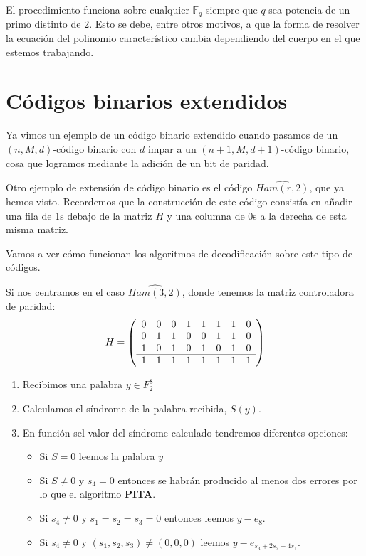 \obs El procedimiento funciona sobre cualquier $\mathbb{F}_q$ siempre que $q$ sea potencia de un primo distinto de 2. Esto se debe, entre otros motivos, a que la forma de resolver la ecuación del polinomio característico cambia dependiendo del cuerpo en el que estemos trabajando.

\section{Códigos binarios extendidos}
Ya vimos un ejemplo de un código binario extendido cuando pasamos de un $(n,M,d)$-código binario con $d$ impar a un $(n+1,M,d+1)$-código binario, cosa que logramos mediante la adición de un bit de paridad.

Otro ejemplo de extensión de código binario es el código $\widehat{Ham(r,2)}$, que ya hemos visto. Recordemos que la construcción de este código consistía en añadir una fila de 1s debajo de la matriz $H$ y una columna de 0s a la derecha de esta misma matriz.

Vamos a ver cómo funcionan los algoritmos de decodificación sobre este tipo de códigos.

Si nos centramos en el caso $\widehat{Ham(3,2)}$, donde tenemos la matriz controladora de paridad:
\[H=\left( \begin{array}{ccccccc | c}
0 & 0 & 0 & 1 & 1 & 1 & 1 & 0 \\
0 & 1 & 1 & 0 & 0 & 1 & 1 & 0 \\
1 & 0 & 1 & 0 & 1 & 0 & 1 & 0 \\ \hline
1 & 1 & 1 & 1 & 1 & 1 & 1 & 1
\end{array}\right)\]

\begin{enumerate}
\item Recibimos una palabra $y\in F_2^8$
\item Calculamos el síndrome de la palabra recibida, $S(y)$.
\item En función sel valor del síndrome calculado tendremos diferentes opciones:
\begin{itemize}
\item Si $S=0$ leemos la palabra $y$
\item Si $S\neq 0$ y $s_4=0$ entonces se habrán producido al menos dos errores por lo que el algoritmo \textbf{PITA}.
\item Si $s_4\neq 0$ y $s_1=s_2=s_3=0$ entonces leemos $y-e_8$.
\item Si $s_4\neq 0$ y $(s_1,s_2,s_3)\neq (0,0,0)$ leemos $y-e_{s_3+2s_2+4s_1}$.
\end{itemize}
\end{enumerate}

